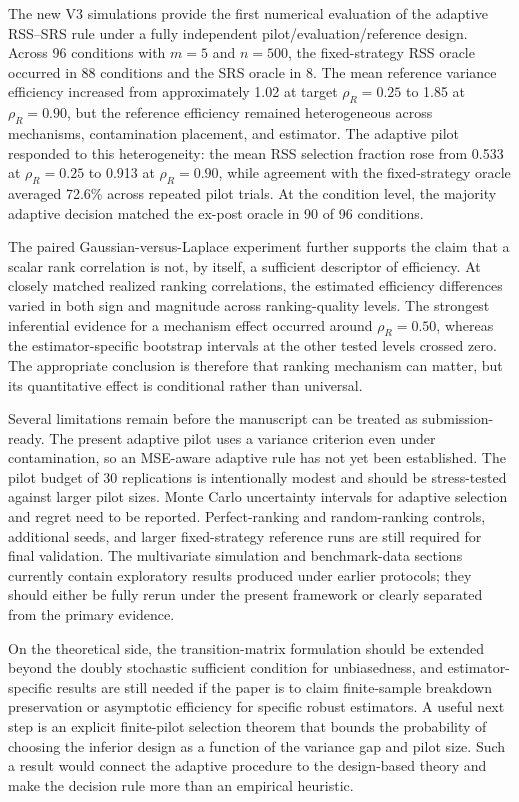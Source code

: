\documentclass[12pt]{article}
\begin{document}
The new V3 simulations provide the first numerical evaluation of the adaptive RSS--SRS rule under a fully independent pilot/evaluation/reference design. Across 96 conditions with $m=5$ and $n=500$, the fixed-strategy RSS oracle occurred in 88 conditions and the SRS oracle in 8. The mean reference variance efficiency increased from approximately 1.02 at target $\rho_R=0.25$ to 1.85 at $\rho_R=0.90$, but the reference efficiency remained heterogeneous across mechanisms, contamination placement, and estimator. The adaptive pilot responded to this heterogeneity: the mean RSS selection fraction rose from 0.533 at $\rho_R=0.25$ to 0.913 at $\rho_R=0.90$, while agreement with the fixed-strategy oracle averaged 72.6\% across repeated pilot trials. At the condition level, the majority adaptive decision matched the ex-post oracle in 90 of 96 conditions.

The paired Gaussian-versus-Laplace experiment further supports the claim that a scalar rank correlation is not, by itself, a sufficient descriptor of efficiency. At closely matched realized ranking correlations, the estimated efficiency differences varied in both sign and magnitude across ranking-quality levels. The strongest inferential evidence for a mechanism effect occurred around $\rho_R=0.50$, whereas the estimator-specific bootstrap intervals at the other tested levels crossed zero. The appropriate conclusion is therefore that ranking mechanism can matter, but its quantitative effect is conditional rather than universal.

Several limitations remain before the manuscript can be treated as submission-ready. The present adaptive pilot uses a variance criterion even under contamination, so an MSE-aware adaptive rule has not yet been established. The pilot budget of 30 replications is intentionally modest and should be stress-tested against larger pilot sizes. Monte Carlo uncertainty intervals for adaptive selection and regret need to be reported. Perfect-ranking and random-ranking controls, additional seeds, and larger fixed-strategy reference runs are still required for final validation. The multivariate simulation and benchmark-data sections currently contain exploratory results produced under earlier protocols; they should either be fully rerun under the present framework or clearly separated from the primary evidence.

On the theoretical side, the transition-matrix formulation should be extended beyond the doubly stochastic sufficient condition for unbiasedness, and estimator-specific results are still needed if the paper is to claim finite-sample breakdown preservation or asymptotic efficiency for specific robust estimators. A useful next step is an explicit finite-pilot selection theorem that bounds the probability of choosing the inferior design as a function of the variance gap and pilot size. Such a result would connect the adaptive procedure to the design-based theory and make the decision rule more than an empirical heuristic.
\end{document}
